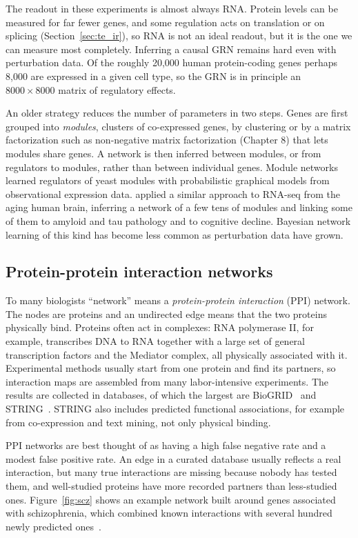The readout in these experiments is almost always RNA. Protein levels can be measured for far fewer genes, and some regulation acts on translation or on splicing (Section~\ref{sec:te_ir}), so RNA is not an ideal readout, but it is the one we can measure most completely. Inferring a causal GRN remains hard even with perturbation data. Of the roughly 20{,}000 human protein-coding genes perhaps 8{,}000 are expressed in a given cell type, so the GRN is in principle an $8000\times 8000$ matrix of regulatory effects.

An older strategy reduces the number of parameters in two steps. Genes are first grouped into \emph{modules}, clusters of co-expressed genes, by clustering or by a matrix factorization such as non-negative matrix factorization (Chapter 8) that lets modules share genes. A network is then inferred between modules, or from regulators to modules, rather than between individual genes. Module networks~\citep{segal2003} learned regulators of yeast modules with probabilistic graphical models from observational expression data. \citet{mostafavi2018} applied a similar approach to RNA-seq from the aging human brain, inferring a network of a few tens of modules and linking some of them to amyloid and tau pathology and to cognitive decline. Bayesian network learning of this kind has become less common as perturbation data have grown.

\subsection{Protein-protein interaction networks}

To many biologists ``network'' means a \emph{protein-protein interaction} (PPI) network. The nodes are proteins and an undirected edge means that the two proteins physically bind. Proteins often act in complexes: RNA polymerase II, for example, transcribes DNA to RNA together with a large set of general transcription factors and the Mediator complex, all physically associated with it. Experimental methods usually start from one protein and find its partners, so interaction maps are assembled from many labor-intensive experiments. The results are collected in databases, of which the largest are BioGRID~\citep{stark2006} and STRING~\citep{szklarczyk2019}. STRING also includes predicted functional associations, for example from co-expression and text mining, not only physical binding.

PPI networks are best thought of as having a high false negative rate and a modest false positive rate. An edge in a curated database usually reflects a real interaction, but many true interactions are missing because nobody has tested them, and well-studied proteins have more recorded partners than less-studied ones. Figure~\ref{fig:scz} shows an example network built around genes associated with schizophrenia, which combined known interactions with several hundred newly predicted ones~\citep{ganapathiraju2016}.

